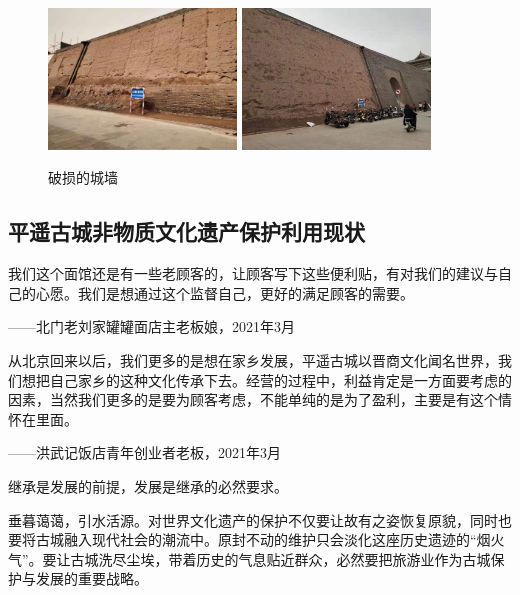 \documentclass[UTF8]{ctexart}
\begin{document}
    \begin{figure}[H]
    \centering
    \includegraphics[width=5cm]{图片 23.png}
    \includegraphics[width=5cm]{图片 24.png}
    \caption{破损的城墙}
    \label{fig:my_label}
    \end{figure}
    \subsection{平遥古城非物质文化遗产保护利用现状}
    我们这个面馆还是有一些老顾客的，让顾客写下这些便利贴，有对我们的建议与自己的心愿。我们是想通过这个监督自己，更好的满足顾客的需要。

    \begin{flushright}
        ——北门老刘家罐罐面店主老板娘，2021年3月
    \end{flushright}
    
    从北京回来以后，我们更多的是想在家乡发展，平遥古城以晋商文化闻名世界，我们想把自己家乡的这种文化传承下去。经营的过程中，利益肯定是一方面要考虑的因素，当然我们更多的是要为顾客考虑，不能单纯的是为了盈利，主要是有这个情怀在里面。
    \begin{flushright}
        ——洪武记饭店青年创业者老板，2021年3月
    \end{flushright}
    \hspace*{\fill}
    
    继承是发展的前提，发展是继承的必然要求。
    
    垂暮蔼蔼，引水活源。对世界文化遗产的保护不仅要让故有之姿恢复原貌，同时也要将古城融入现代社会的潮流中。原封不动的维护只会淡化这座历史遗迹的“烟火气”。要让古城洗尽尘埃，带着历史的气息贴近群众，必然要把旅游业作为古城保护与发展的重要战略。
    
\end{document}
